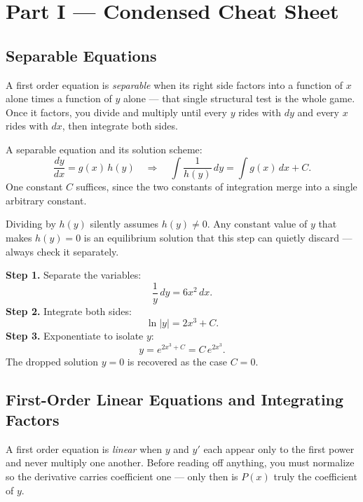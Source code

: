 \documentclass[11pt]{article}
\begin{document}
\section*{Part I --- Condensed Cheat Sheet}
\setcounter{section}{2}   %

\subsection{Separable Equations}

A first order equation is \emph{separable} when its right side factors into a
function of $x$ alone times a function of $y$ alone --- that single structural
test is the whole game. Once it factors, you divide and multiply until every
$y$ rides with $dy$ and every $x$ rides with $dx$, then integrate both sides.

\begin{formulabox}
A separable equation and its solution scheme:
\[
    \frac{dy}{dx} = g(x)\,h(y)
    \quad\Longrightarrow\quad
    \int \frac{1}{h(y)}\,dy = \int g(x)\,dx + C.
\]
One constant $C$ suffices, since the two constants of integration merge into
a single arbitrary constant.
\end{formulabox}

\begin{warningbox}
Dividing by $h(y)$ silently assumes $h(y) \neq 0$. Any constant value of $y$ that
makes $h(y) = 0$ is an equilibrium solution that this step can quietly discard ---
always check it separately.
\end{warningbox}

\begin{examplebox}[Worked Example 2.1: Solve $\frac{dy}{dx} = 6x^{2}y$]
\textbf{Step 1.} Separate the variables:
\[ \frac{1}{y}\,dy = 6x^{2}\,dx. \]
\textbf{Step 2.} Integrate both sides:
\[ \ln|y| = 2x^{3} + C. \]
\textbf{Step 3.} Exponentiate to isolate $y$:
\[ y = e^{2x^{3} + C} = C\,e^{2x^{3}}. \]
The dropped solution $y = 0$ is recovered as the case $C = 0$.
\end{examplebox}

\subsection{First-Order Linear Equations and Integrating Factors}

A first order equation is \emph{linear} when $y$ and $y'$ each appear only to
the first power and never multiply one another. Before reading off anything,
you must normalize so the derivative carries coefficient one --- only then is
$P(x)$ truly the coefficient of $y$.
\end{document}
